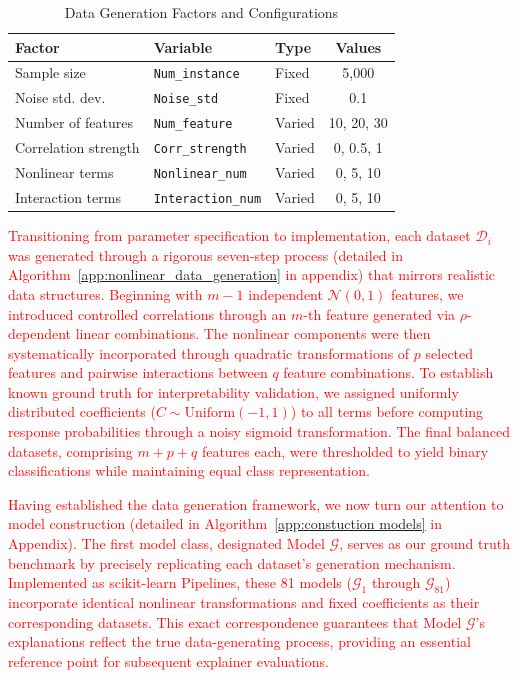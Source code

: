 \begin{table}[htbp]
\centering
\caption{Data Generation Factors and Configurations}
\label{tab:data_factors}
\begin{tabular}{lllc}
\toprule
\textbf{Factor} & \textbf{Variable} & \textbf{Type} & \textbf{Values} \\
\midrule
Sample size & \texttt{Num\_instance} & Fixed & 5,000 \\
Noise std. dev. & \texttt{Noise\_std} & Fixed & 0.1 \\
Number of features & \texttt{Num\_feature} & Varied & 10, 20, 30 \\
Correlation strength & \texttt{Corr\_strength} & Varied & 0, 0.5, 1 \\
Nonlinear terms & \texttt{Nonlinear\_num} & Varied & 0, 5, 10 \\
Interaction terms & \texttt{Interaction\_num} & Varied & 0, 5, 10 \\
\bottomrule
\end{tabular}
\end{table}

\textcolor{red}{Transitioning from parameter specification to implementation, each dataset $\mathcal{D}_i$ was generated through a rigorous seven-step process (detailed in Algorithm~\ref{app:nonlinear_data_generation} in appendix) that mirrors realistic data structures. Beginning with $m-1$ independent $\mathcal{N}(0,1)$ features, we introduced controlled correlations through an $m$-th feature generated via $\rho$-dependent linear combinations. The nonlinear components were then systematically incorporated through quadratic transformations of $p$ selected features and pairwise interactions between $q$ feature combinations. To establish known ground truth for interpretability validation, we assigned uniformly distributed coefficients ($C \sim \text{Uniform}(-1,1)$) to all terms before computing response probabilities through a noisy sigmoid transformation. The final balanced datasets, comprising $m + p + q$ features each, were thresholded to yield binary classifications while maintaining equal class representation.}

\textcolor{red}{Having established the data generation framework, we now turn our attention to model construction (detailed in Algorithm~\ref{app:constuction models} in Appendix). The first model class, designated Model $\mathcal{G}$, serves as our ground truth benchmark by precisely replicating each dataset's generation mechanism. Implemented as scikit-learn Pipelines, these 81 models ($\mathcal{G}_1$ through $\mathcal{G}_{81}$) incorporate identical nonlinear transformations and fixed coefficients as their corresponding datasets. This exact correspondence guarantees that Model $\mathcal{G}$'s explanations reflect the true data-generating process, providing an essential reference point for subsequent explainer evaluations.}

